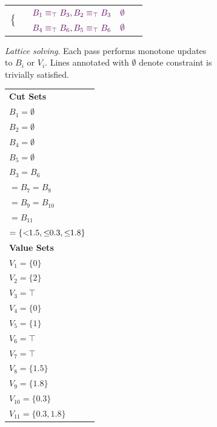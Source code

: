 \begin{figure}[t]
\begin{subfigure}[t]{0.7\linewidth}
{\begin{tabular}{c p{0.28\linewidth} p{0.38\linewidth}}
	      \multirow{2}{*}{
	        \textcolor{black}{
	          $\left\{
	          \begin{array}{c}
	          \\ \\
	          \end{array}
	          \right.$
	        }
	        \;\textsc{\circled{7}}
	      }
	      & $\textcolor{violet}{B_1 \equiv_{\top} B_3, B_2 \equiv_{\top} B_3}$
	        & $\textcolor{violet}{\emptyset}$ \\

	      & $\textcolor{violet}{B_4 \equiv_{\top} B_6, B_5 \equiv_{\top} B_6}$
	        & $\textcolor{violet}{\emptyset}$ \\

	      \end{tabular}
    }
      \caption{\emph{Lattice solving}. Each pass performs monotone updates to $B_i$ or $V_i$. Lines annotated with $\emptyset$ denote constraint is trivially satisfied.}
  \end{subfigure}
  \hfill
  \begin{subfigure}[t]{0.24\linewidth}
      \centering
      \begin{tabular}{p{0.95\linewidth}}

      \textbf{Cut Sets} \\[0.3em]
      $B_1 = \emptyset$ \\
      $B_2 = \emptyset$ \\
      $B_4 = \emptyset$ \\
      $B_5 = \emptyset$ \\
      $B_3 = B_6$ \\
      $ = B_7 = B_8$ \\
      $ = B_9 = B_{10}$ \\
      $ = B_{11} $ \\
      $ = \{<\!\!{1.5}, \leq\!\!{0.3}, \leq\!\!{1.8}\}$ \\[0.6em]

      \textbf{Value Sets} \\[0.3em]
      $V_1 = \{0\}$ \\
      $V_2 = \{2\}$ \\
      $V_3 = \top$ \\
      $V_4 = \{0\}$ \\
      $V_5 = \{1\}$ \\
      $V_6 = \top$ \\
      $V_7 = \top$ \\
      $V_8 = \{1.5\}$ \\
      $V_9 = \{1.8\}$ \\
      $V_{10} = \{0.3\}$ \\
      $V_{11} = \{0.3, 1.8\}$ \\


\end{tabular}
\end{subfigure}
\end{figure}
